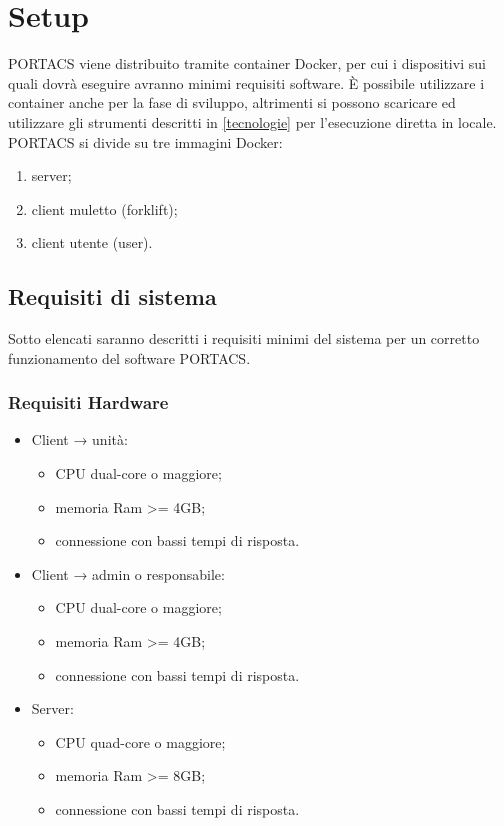 \section{Setup}
PORTACS viene distribuito tramite container Docker, per cui i dispositivi sui quali dovrà eseguire avranno minimi requisiti software. È possibile utilizzare i container anche per la fase di sviluppo, altrimenti si possono scaricare ed utilizzare gli strumenti descritti in \ref{tecnologie} per l'esecuzione diretta in locale. PORTACS si divide su tre immagini Docker:
\begin{enumerate}
    \item server;
    \item client muletto (forklift);
    \item client utente (user).
\end{enumerate}


\subsection{Requisiti di sistema}
Sotto elencati saranno descritti i requisiti minimi del sistema per un corretto funzionamento del software PORTACS.


\subsubsection{Requisiti Hardware}
\begin{itemize}
	\item Client → unità:
\begin{itemize}
	\item CPU dual-core o maggiore;
	\item memoria Ram >= 4GB;
	\item connessione con bassi tempi di risposta.
\end{itemize}
	\item Client → admin o responsabile:
\begin{itemize}
	\item CPU dual-core o maggiore;
	\item memoria Ram >= 4GB;
	\item connessione con bassi tempi di risposta.
\end{itemize}
	\item Server:
\begin{itemize}
	\item CPU quad-core o maggiore;
	\item memoria Ram >= 8GB;
	\item connessione con bassi tempi di risposta.
\end{itemize}
\end{itemize}

